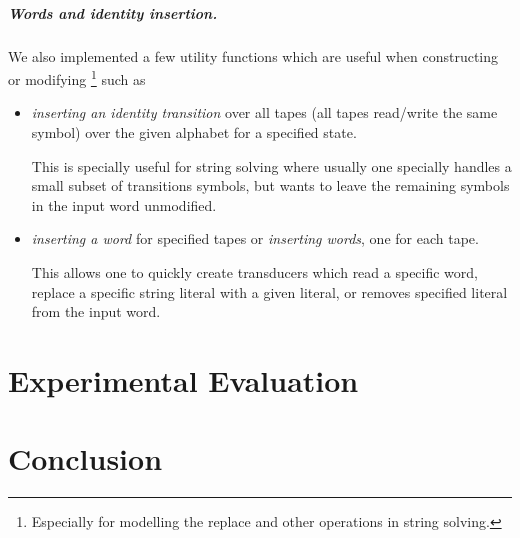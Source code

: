 \paragraph{Words and identity insertion.}
We also implemented a few utility functions which are useful when constructing or modifying \nfts\footnote{Especially for modelling the replace and other operations in string solving.} such as
\begin{itemize}
  \item \emph{inserting an identity transition} over all tapes (all tapes read/write the same symbol) over the given alphabet for a specified state.

  This is specially useful for string solving where usually one specially handles a small subset of transitions symbols, but wants to leave the remaining symbols in the input word unmodified.

  \item \emph{inserting a word} for specified tapes or \emph{inserting words}, one for each tape.

  This allows one to quickly create transducers which read a specific word, replace a specific string literal with a given literal, or removes specified literal from the input word.
\end{itemize}


\chapter{Experimental Evaluation}

\chapter{Conclusion}


% 
